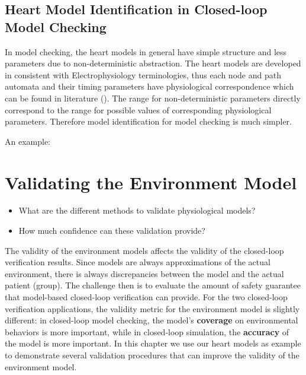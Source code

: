 \section{Heart Model Identification in Closed-loop Model Checking}
In model checking, the heart models in general have simple structure and less parameters due to non-deterministic abstraction. The heart models are developed in consistent with Electrophysiology terminologies, thus each node and path automata and their timing parameters have physiological correspondence which can be found in literature (\cite{josephson}). The range for non-deterministic parameters directly correspond to the range for possible values of corresponding physiological parameters. Therefore model identification for model checking is much simpler. 

An example: 







\chapter{Validating the Environment Model}
\begin{itemize}
	\item What are the different methods to validate physiological models?
    \item How much confidence can these validation provide?
\end{itemize}
The validity of the environment models affects the validity of the closed-loop verification results. Since models are always approximations of the actual environment, there is always discrepancies between the model and the actual patient (group). The challenge then is to evaluate the amount of safety guarantee that model-based closed-loop verification can provide. For the two closed-loop verification applications, the validity metric for the environment model is slightly different: in closed-loop model checking, the model's \textbf{coverage} on environmental behaviors is more important, while in closed-loop simulation, the \textbf{accuracy} of the model is more important. In this chapter we use our heart models as example to demonstrate several validation procedures that can improve the validity of the environment model.

